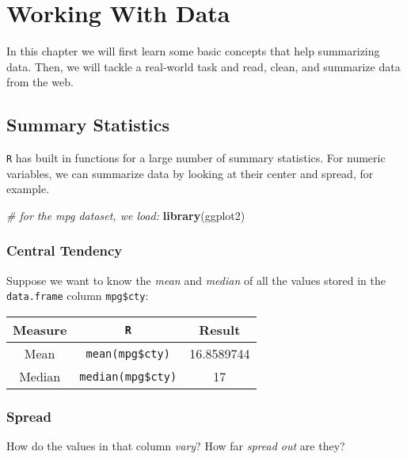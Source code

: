 \documentclass[]{book}
\newenvironment{Shaded}{\begin{snugshade}}{\end{snugshade}}
\newcommand{\CommentTok}[1]{\textcolor[rgb]{0.56,0.35,0.01}{\textit{#1}}}
\newcommand{\KeywordTok}[1]{\textcolor[rgb]{0.13,0.29,0.53}{\textbf{#1}}}
\newcommand{\NormalTok}[1]{#1}
\begin{document}
\hypertarget{sum}{%
\chapter{Working With Data}\label{sum}}

In this chapter we will first learn some basic concepts that help summarizing data. Then, we will tackle a real-world task and read, clean, and summarize data from the web.

\hypertarget{summary-statistics}{%
\section{Summary Statistics}\label{summary-statistics}}

\texttt{R} has built in functions for a large number of summary statistics. For numeric variables, we can summarize data by looking at their center and spread, for example.

\begin{Shaded}
\begin{Highlighting}[]
\CommentTok{# for the mpg dataset, we load:}
\KeywordTok{library}\NormalTok{(ggplot2)}
\end{Highlighting}
\end{Shaded}

\hypertarget{central-tendency}{%
\subsection*{Central Tendency}\label{central-tendency}}

Suppose we want to know the \emph{mean} and \emph{median} of all the values stored in the \texttt{data.frame} column \texttt{mpg\$cty}:

\begin{longtable}[]{@{}ccc@{}}
\toprule
Measure & \texttt{R} & Result\tabularnewline
\midrule
\endhead
Mean & \texttt{mean(mpg\$cty)} & 16.8589744\tabularnewline
Median & \texttt{median(mpg\$cty)} & 17\tabularnewline
\bottomrule
\end{longtable}

\hypertarget{spread}{%
\subsection*{Spread}\label{spread}}

How do the values in that column \emph{vary}? How far \emph{spread out} are they?
\end{document}
